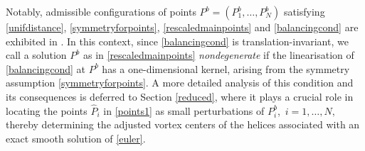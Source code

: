 \documentclass[11pt,reqno,a4paper]{amsart}
\numberwithin{equation}{section}
\begin{document}
Notably, admissible configurations of points $P^{b}=\left(P^{b}_1,\dots,P^{b}_N\right)$ satisfying \eqref{unifdistance}, \eqref{symmetryforpoints}, \eqref{rescaledmainpoints} and \eqref{balancingcond} are exhibited in \cites{MR4404610,MR4350893}. In this context, since \eqref{balancingcond} is translation-invariant, we call a solution $P^{b}$ as in \eqref{rescaledmainpoints} \emph{nondegenerate} if the linearisation of \eqref{balancingcond} at $P^{b}$ has a one-dimensional kernel, arising from the symmetry assumption  \eqref{symmetryforpoints}. A more detailed analysis of this condition and its consequences is deferred to Section \ref{reduced}, where it plays a crucial role in locating the points $\widehat{P}_i$ in \eqref{points1} as small perturbations of $P_i^{b}$,\, $i=1,\dots,N,$ thereby determining the adjusted vortex centers of the helices associated with an exact smooth solution of \eqref{euler}.
\end{document}
